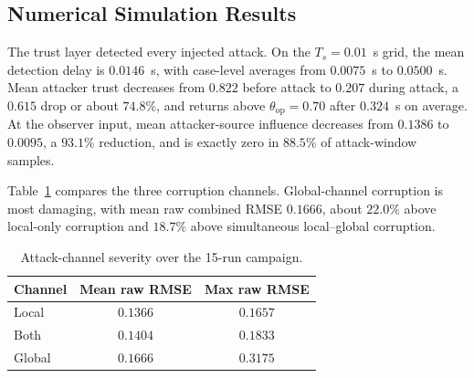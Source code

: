 \documentclass[letterpaper,journal]{IEEEtran}
\begin{document}
\subsection{Numerical Simulation Results}



The trust layer detected every injected attack. On the $T_s=0.01$~s grid, the mean detection delay is $0.0146$~s, with case-level averages from $0.0075$~s to $0.0500$~s. Mean attacker trust decreases from $0.822$ before attack to $0.207$ during attack, a $0.615$ drop or about $74.8\%$, and returns above $\theta_{\mathrm{op}}=0.70$ after $0.324$~s on average. At the observer input, mean attacker-source influence decreases from $0.1386$ to $0.0095$, a $93.1\%$ reduction, and is exactly zero in $88.5\%$ of attack-window samples.

Table~\ref{tab:attack_mode_rmse_summary} compares the three corruption channels. Global-channel corruption is most damaging, with mean raw combined RMSE $0.1666$, about $22.0\%$ above local-only corruption and $18.7\%$ above simultaneous local--global corruption.

\begin{table}[!t]
\centering
\caption{Attack-channel severity over the 15-run campaign.}
\label{tab:attack_mode_rmse_summary}
\scriptsize
\begin{tabular}{lcc}
\toprule
\textbf{Channel} & \textbf{Mean raw RMSE} & \textbf{Max raw RMSE} \\
\midrule
Local & $0.1366$ & $0.1657$ \\
Both  & $0.1404$ & $0.1833$ \\
Global & $0.1666$ & $0.3175$ \\
\bottomrule
\end{tabular}
\end{table}
\end{document}
